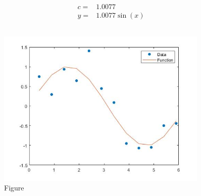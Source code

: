 \documentclass{article}
\begin{document}
    \section{}
        \subsection{}
        
        
        \begin{equation*}
            \begin{split}
                c=&1.0077\\
                y=&1.0077\sin(x)
            \end{split}
        \end{equation*}
    \subsection{}
        \begin{figure}[H] 
            \centering 
            \includegraphics[width=0.9\textwidth]{img/Assignement_4_3_1.jpg}
            \caption{Figure} 
        \end{figure}
    \section{}
\end{document}
